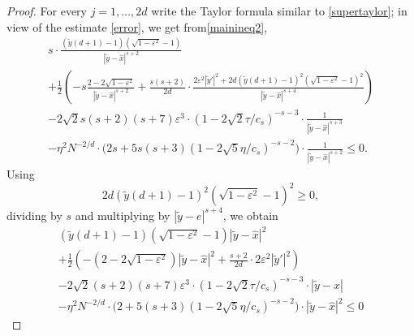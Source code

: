 \documentclass[12pt]{amsart}
\theoremstyle{definition}
\def\ep{\varepsilon}
\newcommand{\1}{\mathbf{1}}
\begin{document}
\begin{proof}
For every $j=1,\ldots, 2d$ write the Taylor formula similar to \eqref{supertaylor}; in view of the estimate \eqref{error}, we get from\eqref{mainineq2},
\begin{multline}
s\cdot \frac{(\tilde y(d+1)-1)(\sqrt{1-\ep^2}-1)}{|\tilde y-\hat{x}|^{s+2}} 
\\ +\frac12 \left(-s\frac{2-2\sqrt{1-\ep^2}}{|\tilde{y}-\hat{x}|^{s+2}}+\frac{s(s+2)}{2d}\cdot \frac{2\ep^2 |\tilde y'|^2 + 2d (\tilde y(d+1)-1)^2 (\sqrt{1-\ep^2}-1)^2}{|\tilde y-\hat{x}|^{s+4}}\right)  \\
-2\sqrt{2}s(s+2)(s+7)\ep^3 \cdot (1-2\sqrt{2}\tau/c_s)^{-s-3}\cdot \frac{1}{|\tilde y-\hat{x}|^{s+3}} \\ 
-\eta^2 N^{-2/d}\cdot \Big(2s+5s (s+3)(1-2\sqrt{5}\eta / c_s)^{-s-2}\Big)\cdot \frac{1}{|\tilde y-\hat{x}|^{s+2}} \leqslant 0.
\end{multline}
Using
$$
2d (\tilde y(d+1)-1)^2 (\sqrt{1-\ep^2}-1)^2\geqslant 0,
$$
dividing by $s$ and multiplying by $|\tilde y-e|^{s+4}$, we obtain
\begin{multline}\label{mainineq33}
(\tilde y(d+1)-1)(\sqrt{1-\ep^2}-1)|\tilde y-\hat{x}|^{2} \\ 
+\frac12 \left(-(2-2\sqrt{1-\ep^2})|\tilde{y}-\hat{x}|^2+\frac{s+2}{2d}\cdot 2\ep^2 |\tilde y'|^2\right)  \\
-2\sqrt{2}(s+2)(s+7)\ep^3 \cdot (1-2\sqrt{2}\tau/c_s)^{-s-3}\cdot |\tilde y-\hat{x}|  \\
-\eta^2 N^{-2/d}\cdot \Big(2+5 (s+3)(1-2\sqrt{5}\eta / c_s)^{-s-2}\Big)\cdot |\tilde y-\hat{x}|^2 \leqslant 0
\end{multline}


\end{proof}
\end{document}
